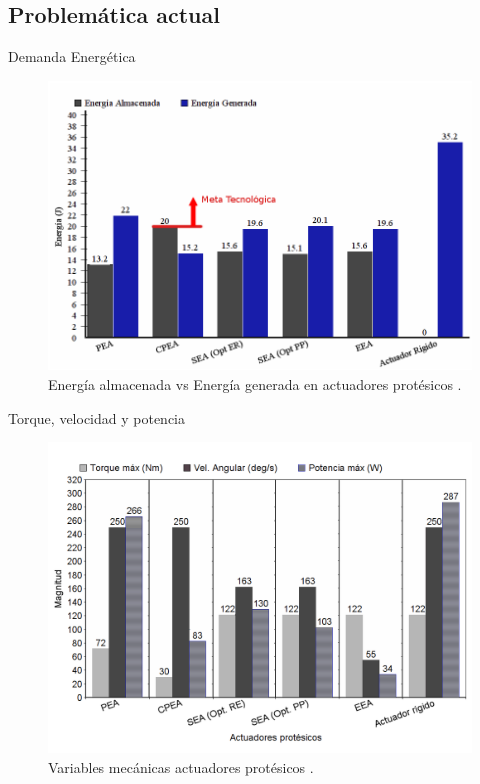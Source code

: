 \documentclass[10pt]{beamer}
\begin{document}
\subsection{Problemática actual}
\begin{frame}{Demanda Energética}

\begin{figure}
\begin{centering}
\includegraphics[scale=0.3]{Feathergraphics/20160113105227}
\caption{Energía almacenada vs Energía generada en actuadores protésicos \cite{Cherelle2014a}.}
\par\end{centering}
\end{figure}

\end{frame}

\begin{frame}{Torque, velocidad y potencia}

\begin{figure}
\begin{centering}
\includegraphics[scale=0.32]{Feathergraphics/20160414035751}
\par\end{centering}
\caption{Variables mecánicas actuadores protésicos \cite{Cherelle2014a}.}

\end{figure}

\end{frame}
\end{document}
